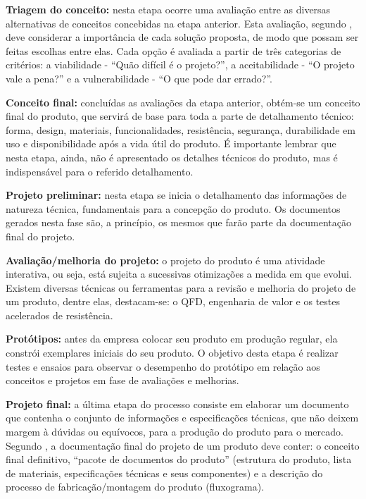 \textbf{Triagem do conceito:} nesta etapa ocorre uma avaliação entre as diversas alternativas de conceitos concebidas na etapa anterior. Esta avaliação, segundo \cite{slack2006administracao}, deve considerar a importância de cada solução proposta, de modo que possam ser feitas escolhas entre elas. Cada opção é avaliada a partir de três categorias de critérios: a viabilidade - ``Quão difícil é o projeto?'', a aceitabilidade - ``O projeto vale a pena?'' e a vulnerabilidade - ``O que pode dar errado?''.

\textbf{Conceito final:} concluídas as avaliações da etapa anterior, obtém-se um conceito final do produto, que servirá de base para toda a parte de detalhamento técnico: forma, design, materiais, funcionalidades, resistência, segurança, durabilidade em uso e disponibilidade após a vida útil do produto. É importante lembrar que nesta etapa, ainda, não é apresentado os detalhes técnicos do produto, mas é indispensável para o referido detalhamento.

\textbf{Projeto preliminar:} nesta etapa se inicia o detalhamento das informações de natureza técnica, fundamentais para a concepção do produto. Os documentos gerados nesta fase são, a princípio, os mesmos que farão parte da documentação final do projeto.

\textbf{Avaliação/melhoria do projeto:} o projeto do produto é uma atividade interativa, ou seja, está sujeita a sucessivas otimizações a medida em que evolui. Existem diversas técnicas ou ferramentas para a revisão e melhoria do projeto de um produto, dentre elas, destacam-se: o \ac{QFD}, engenharia de valor e os testes acelerados de resistência.

\textbf{Protótipos:} antes da empresa colocar seu produto em produção regular, ela constrói exemplares iniciais do seu produto. O objetivo desta etapa é realizar testes e ensaios para observar o desempenho do protótipo em relação aos conceitos e projetos em fase de avaliações e melhorias.

\textbf{Projeto final:} a última etapa do processo consiste em elaborar um documento que contenha o conjunto de informações e especificações técnicas, que não deixem margem à dúvidas ou equívocos, para a produção do produto para o mercado. Segundo \cite{slack2006administracao}, a documentação final do projeto de um produto deve conter: o conceito final definitivo, ``pacote de documentos do produto'' (estrutura do produto, lista de materiais, especificações técnicas e seus componentes) e a descrição do processo de fabricação/montagem do produto (fluxograma).


